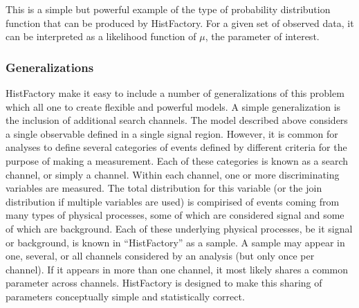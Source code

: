 
This is a simple but powerful example of the type of probability distribution function that can be produced by HistFactory.
For a given set of observed data, it can be interpreted as a likelihood function of $\mu$, the parameter of interest.



\subsubsection{Generalizations}

HistFactory make it easy to include a number of generalizations of this problem which all one to create flexible and powerful models.
A simple generalization is the inclusion of additional search channels.
The model described above considers a single observable defined in a single signal region.
However, it is common for analyses to define several categories of events defined by different criteria for the purpose of making a measurement.
Each of these categories is known as a search channel, or simply a channel.
Within each channel, one or more discriminating variables are measured.
The total distribution for this variable (or the join distribution if multiple variables are used) is compirised of events coming from many types of physical processes, 
some of which are considered signal and some of which are background.
Each of these underlying physical processes, be it signal or background, is known in ``HistFactory'' as a sample.
A sample may appear in one, several, or all channels considered by an analysis (but only once per channel).
If it appears in more than one channel, it most likely shares a common parameter across channels.
HistFactory is designed to make this sharing of parameters conceptually simple and statistically correct.

